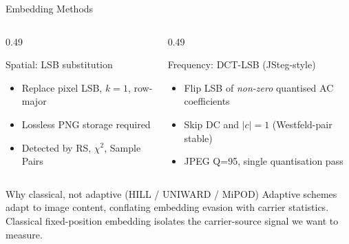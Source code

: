 \documentclass[aspectratio=169,11pt]{beamer}
\begin{document}
\begin{frame}{Embedding Methods}
\small
\begin{columns}[T]
\begin{column}{0.49\textwidth}
\begin{block}{Spatial: LSB substitution}
\begin{itemize}
\item Replace pixel LSB, $k\!=\!1$, row-major
\item Lossless PNG storage required
\item Detected by RS, $\chi^2$, Sample Pairs
\end{itemize}
\end{block}
\end{column}
\begin{column}{0.49\textwidth}
\begin{block}{Frequency: DCT-LSB (JSteg-style)}
\begin{itemize}
\item Flip LSB of \emph{non-zero} quantised AC coefficients
\item Skip DC and $|c|\!=\!1$ (Westfeld-pair stable)
\item JPEG Q=95, single quantisation pass
\end{itemize}
\end{block}
\end{column}
\end{columns}
\vspace{0.1cm}
\begin{exampleblock}{Why classical, not adaptive (HILL / UNIWARD / MiPOD)}
Adaptive schemes adapt to image content, conflating embedding evasion with carrier statistics. Classical fixed-position embedding isolates the carrier-source signal we want to measure.
\end{exampleblock}
\end{frame}
\end{document}
